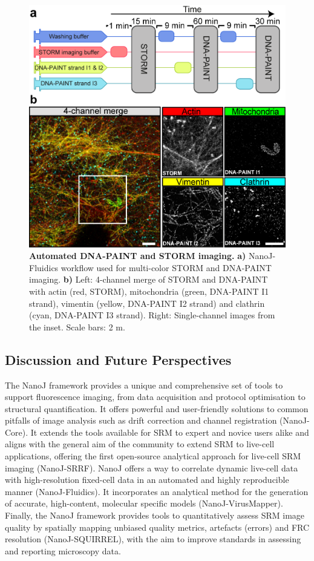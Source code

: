  \begin{figure}[!t]
    \centering
    \includegraphics{Figures/FigurePumpy_v5.png}
    \caption{\textbf{Automated DNA-PAINT and STORM imaging.} \textbf{a)} NanoJ-Fluidics workflow used for multi-color STORM and DNA-PAINT imaging. \textbf{b)} Left: 4-channel merge of STORM and DNA-PAINT with actin (red, STORM), mitochondria (green, DNA-PAINT I1 strand), vimentin (yellow, DNA-PAINT I2 strand) and clathrin (cyan, DNA-PAINT I3 strand). Right: Single-channel images from the inset. Scale bars: 2 \textmu{}m.}
    \label{fig:PAINT}
 \end{figure}

\subsection*{Discussion and Future Perspectives}
 The NanoJ framework provides a unique and comprehensive set of tools to support fluorescence imaging, from data acquisition and protocol optimisation to structural quantification. It offers powerful and user-friendly solutions to common pitfalls of image analysis such as drift correction and channel registration (NanoJ-Core). It extends the tools available for SRM to expert and novice users alike and aligns with the general aim of the community to extend SRM to live-cell applications, offering the first open-source analytical approach for live-cell SRM imaging (NanoJ-SRRF). NanoJ offers a way to correlate dynamic live-cell data with high-resolution fixed-cell data in an automated and highly reproducible manner (NanoJ-Fluidics). It incorporates an analytical method for the generation of accurate, high-content, molecular specific models (NanoJ-VirusMapper). Finally, the NanoJ framework provides tools to quantitatively assess SRM image quality by spatially mapping unbiased quality metrics, artefacts (errors) and FRC resolution (NanoJ-SQUIRREL), with the aim to improve standards in assessing and reporting microscopy data. 
 

